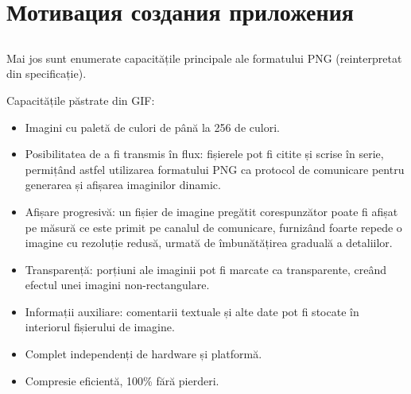 \documentclass[a4paper,12pt]{report}
\begin{document}
\section{Мотивация создания приложения}

\subsection{}

\subsection{}

\subsection{}

Mai jos sunt enumerate capacitățile principale ale formatului \ac{PNG} (reinterpretat din specificație)\cite[1.]{png_spec}.

Capacitățile păstrate din GIF:

\begin{itemize}
    \item
        Imagini cu paletă de culori de până la 256 de culori.
        
    \item
        Posibilitatea de a fi transmis în flux:
        fișierele pot fi citite și scrise în serie, permițând astfel utilizarea formatului
        PNG ca protocol de comunicare pentru generarea și afișarea imaginilor dinamic.

    \item
        Afișare progresivă: un fișier de imagine pregătit corespunzător poate fi
        afișat pe măsură ce este primit pe canalul de comunicare,
        furnizând foarte repede o imagine cu rezoluție redusă,
        urmată de îmbunătățirea graduală a detaliilor.

    \item
        Transparență: porțiuni ale imaginii pot fi marcate ca transparente,
        creând efectul unei imagini non-rectangulare.

    \item 
        Informații auxiliare: comentarii textuale și alte date pot fi
        stocate în interiorul fișierului de imagine.

    \item
        Complet independenți de hardware și platformă.

    \item
        Compresie eficientă, 100\% fără pierderi.
\end{itemize}
\end{document}
